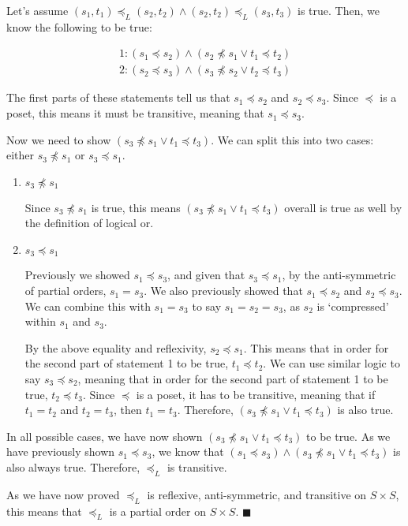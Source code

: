 \documentclass{article}
\begin{document}
\begin{enumerate}
Let's assume $(s_1, t_1) \preceq_{L} (s_2, t_2) \land (s_2, t_2) \preceq_{L} (s_3, t_3)$ is true. Then, we know the following to be true:

\vspace{-15pt}
\begin{align*}
1: (s_1 \preceq s_2) \land (s_2 \npreceq s_1 \lor t_1 \preceq t_2) \\
2: (s_2 \preceq s_3) \land (s_3 \npreceq s_2 \lor t_2 \preceq t_3) 
\end{align*}

The first parts of these statements tell us that $s_1 \preceq s_2$ and $s_2 \preceq s_3$. Since $\preceq$ is a poset, this means it must be transitive, meaning that $s_1 \preceq s_3$.

Now we need to show $(s_3 \npreceq s_1 \lor t_1 \preceq t_3)$. We can split this into two cases: either $s_3 \npreceq s_1$ or $s_3 \preceq s_1$.

\begin{enumerate}

\item $s_3 \npreceq s_1$

Since $s_3 \npreceq s_1$ is true, this means $(s_3 \npreceq s_1 \lor t_1 \preceq t_3)$ overall is true as well by the definition of logical or.

\item $s_3 \preceq s_1$

Previously we showed $s_1 \preceq s_3$, and given that $s_3 \preceq s_1$, by the anti-symmetric of partial orders, $s_1 = s_3$. We also previously showed that $s_1 \preceq s_2$ and $s_2 \preceq s_3$. We can combine this with $s_1 = s_3$ to say $s_1 = s_2 = s_3$, as $s_2$ is `compressed' within $s_1$ and $s_3$. 

By the above equality and reflexivity, $s_2 \preceq s_1$. This means that in order for the second part of statement 1 to be true, $t_1 \preceq t_2$. We can use similar logic to say $s_3 \preceq s_2$, meaning that in order for the second part of statement 1 to be true, $t_2 \preceq t_3$. Since $\preceq$ is a poset, it has to be transitive, meaning that if $t_1 = t_2$ and $t_2 = t_3$, then $t_1 = t_3$. Therefore, $(s_3 \npreceq s_1 \lor t_1 \preceq t_3)$ is also true.

\end{enumerate}

In all possible cases, we have now shown $(s_3 \npreceq s_1 \lor t_1 \preceq t_3)$  to be true. As we have previously shown $s_1 \preceq s_3$, we know that $(s_1 \preceq s_3) \land (s_3 \npreceq s_1 \lor t_1 \preceq t_3)$ is also always true. Therefore, $\preceq_{L}$ is transitive.

\end{enumerate}

As we have now proved $\preceq_{L}$ is reflexive, anti-symmetric, and transitive on $S \times S$, this means that $\preceq_{L}$ is a partial order on $S \times S$. $\blacksquare$
\end{document}
